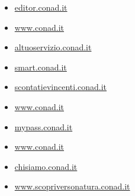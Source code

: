 \documentclass{article}
\begin{document}
\begin{itemize}
        
        
        \item \href{ https://editor.conad.it/libs/granite/core/content/login.html?resource=\%2F\&$$login$$=\%24\%24login\%24\%24\&j\_reason=unknown\&j\_reason\_code=unknown }{ editor.conad.it }
    
        
        
        \item \href{ https://www.conad.it/?utm\_source=google\&utm\_medium=cpc\&utm\_campaign=cnd\_wpp\_conad\&utm\_content=conadit\&utm\_term=sea\&s\_kwcid=AL!13157!3!646015855084!e!!g!!conad\&gclid=CjwKCAiA\_6yfBhBNEiwAkmXy58ytQtGD\_SxOBMipzUWBv7BOcasOdBDb4TCAn2r-KzU8n2dw7E0CGBoCbHQQAvD\_BwE }{ www.conad.it }
    
        
        
        \item \href{ https://altuoservizio.conad.it/ }{ altuoservizio.conad.it }
    
        
        
        \item \href{ http://smart.conad.it }{ smart.conad.it }
    
        
        
        \item \href{ https://scontatievincenti.conad.it/ }{ scontatievincenti.conad.it }
    
        
        
        \item \href{ https://www.conad.it/servizio-clienti-e-faq?utm\_source=massiva\&utm\_medium=email\&utm\_content=124717596\&utm\_campaign=\_2021\_NON\_CANCELLARE\_Test\_Proof\_Agenzia\&p1=\%2Fnegozio.007471 }{ www.conad.it }
    
        
        
        \item \href{ https://mypass.conad.it/mypass/ }{ mypass.conad.it }
    
        
        
        \item \href{ https://www.conad.it/esperienze-di-gusto.html }{ www.conad.it }
    
        
        
        \item \href{ https://chisiamo.conad.it/ }{ chisiamo.conad.it }
    
        
        
        \item \href{ https://www.scopriversonatura.conad.it/ }{ www.scopriversonatura.conad.it }
    

\end{itemize}
\end{document}
